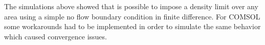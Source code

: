 \begin{doublespace}
The simulations above showed that is possible to impose a density limit over any area using a simple no flow boundary condition in finite difference. For COMSOL some workarounds had to be implemented in order to simulate the same behavior which caused convergence issues. 


\end{doublespace}